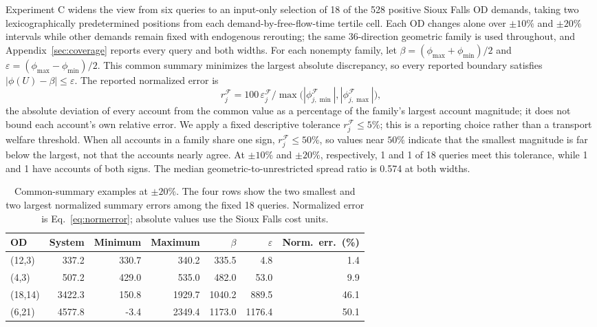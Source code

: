 Experiment C widens the view from six queries to an input-only selection of 18 of the 528 positive Sioux Falls OD demands, taking two lexicographically predetermined positions from each demand-by-free-flow-time tertile cell. Each OD changes alone over $\pm10\%$ and $\pm20\%$ intervals while other demands remain fixed with endogenous rerouting; the same 36-direction geometric family is used throughout, and Appendix~\ref{sec:coverage} reports every query and both widths. For each nonempty family, let $\beta=(\phi_{\max}+\phi_{\min})/2$ and $\varepsilon=(\phi_{\max}-\phi_{\min})/2$. This common summary minimizes the largest absolute discrepancy, so every reported boundary satisfies $|\phi(U)-\beta|\leq\varepsilon$. The reported normalized error is
\begin{equation}
r_j^{\mathcal F}=100\,\varepsilon_j^{\mathcal F}\Big/\max\bigl(|\phi_{j,\min}^{\mathcal F}|,|\phi_{j,\max}^{\mathcal F}|\bigr),
\label{eq:normerror}
\end{equation}
the absolute deviation of every account from the common value as a
percentage of the family's largest account magnitude; it does not bound
each account's own relative error. We apply a fixed descriptive tolerance
$r_j^{\mathcal F}\leq5\%$; this is a reporting choice rather than a
transport welfare threshold. When all accounts in a family share one
sign, $r_j^{\mathcal F}\leq50\%$, so values near $50\%$ indicate that
the smallest magnitude is far below the largest, not that the accounts
nearly agree.
At $\pm10\%$ and $\pm20\%$, respectively, 1 and 1 of 18 queries meet this tolerance, while 1 and 1 have accounts of both signs. The median geometric-to-unrestricted spread ratio is 0.574 at both widths.
\begin{table}[t]\centering\small\caption{Common-summary examples at $\pm20\%$. The four rows show the two smallest and two largest normalized summary errors among the fixed 18 queries. Normalized error is Eq.~\eqref{eq:normerror}; absolute values use the Sioux Falls cost units.}\label{tab:coverage_summary}\begin{tabular}{lrrrrrr}\toprule OD & System & Minimum & Maximum & $\beta$ & $\varepsilon$ & Norm.\ err.\ (\%)\\\midrule
(12,3) & 337.2 & 330.7 & 340.2 & 335.5 & 4.8 & 1.4\\
(4,3) & 507.2 & 429.0 & 535.0 & 482.0 & 53.0 & 9.9\\
(18,14) & 3422.3 & 150.8 & 1929.7 & 1040.2 & 889.5 & 46.1\\
(6,21) & 4577.8 & -3.4 & 2349.4 & 1173.0 & 1176.4 & 50.1\\
\bottomrule\end{tabular}\end{table}
